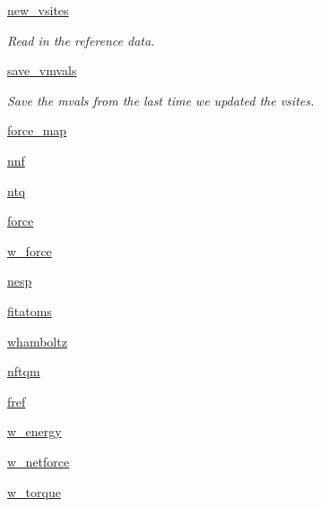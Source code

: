 \begin{DoxyCompactItemize}
\hyperlink{classforcebalance_1_1abinitio_1_1AbInitio_a64f1aeadac4d7b09424c20b83e5ad5af}{new\-\_\-vsites}
\begin{DoxyCompactList}\small\item\em Read in the reference data. \end{DoxyCompactList}\item 
\hyperlink{classforcebalance_1_1abinitio_1_1AbInitio_a22037bf43728fa45f387390005e0b131}{save\-\_\-vmvals}
\begin{DoxyCompactList}\small\item\em Save the mvals from the last time we updated the vsites. \end{DoxyCompactList}\item 
\hyperlink{classforcebalance_1_1abinitio_1_1AbInitio_a6558ea4f56053b0f539f987481c57a75}{force\-\_\-map}
\item 
\hyperlink{classforcebalance_1_1abinitio_1_1AbInitio_ac4a5765bf5b089176518f47004fcdb39}{nnf}
\item 
\hyperlink{classforcebalance_1_1abinitio_1_1AbInitio_af8a895f61ddea6b9ca2765ddbf309a75}{ntq}
\item 
\hyperlink{classforcebalance_1_1abinitio_1_1AbInitio_ab483592ce22356d09b52eb594f2f4b8e}{force}
\item 
\hyperlink{classforcebalance_1_1abinitio_1_1AbInitio_a4ec4863edbb6ea4a28777de905d621d3}{w\-\_\-force}
\item 
\hyperlink{classforcebalance_1_1abinitio_1_1AbInitio_ac258ad6180275ba2ffe5f68d1217e4ac}{nesp}
\item 
\hyperlink{classforcebalance_1_1abinitio_1_1AbInitio_a8b12ea0418108cc6c7693d75cc00227f}{fitatoms}
\item 
\hyperlink{classforcebalance_1_1abinitio_1_1AbInitio_a8f70f017ca8ec54c1acdbc85eff06ab9}{whamboltz}
\item 
\hyperlink{classforcebalance_1_1abinitio_1_1AbInitio_a64ae24d7e979723e65358e227b132a4a}{nftqm}
\item 
\hyperlink{classforcebalance_1_1abinitio_1_1AbInitio_ac974dfef45b416947dd21876443d808a}{fref}
\item 
\hyperlink{classforcebalance_1_1abinitio_1_1AbInitio_aa7f09e2ffc1253844c9f0736caf9b9e5}{w\-\_\-energy}
\item 
\hyperlink{classforcebalance_1_1abinitio_1_1AbInitio_af7cbfd50ca6a0b408c417e8d3bdb7cf3}{w\-\_\-netforce}
\item 
\hyperlink{classforcebalance_1_1abinitio_1_1AbInitio_a67643b98cce62c06c95f085d3a3e9722}{w\-\_\-torque}
\item 

\end{DoxyCompactItemize}
